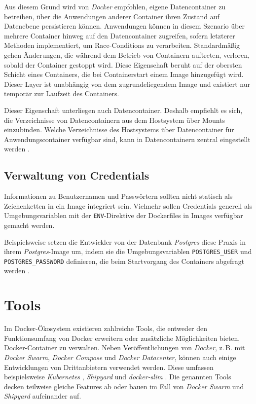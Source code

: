 \documentclass[../main.tex]{subfiles}
\begin{document}
      Aus diesem Grund wird von \emph{Docker} empfohlen, eigene Datencontainer zu betreiben, über die Anwendungen anderer Container ihren Zustand auf Datenebene persistieren können. Anwendungen können in diesem Szenario über mehrere Container hinweg auf den Datencontainer zugreifen, sofern letzterer Methoden implementiert, um Race-Conditions zu verarbeiten. Standardmäßig gehen Änderungen, die während dem Betrieb von Containern auftreten, verloren, sobald der Container gestoppt wird. Diese Eigenschaft beruht auf der obersten Schicht eines Containers, die bei Containerstart einem Image hinzugefügt wird. Dieser Layer ist unabhängig von dem zugrundeliegendem Image und existiert nur temporär zur Laufzeit des Containers.

      Dieser Eigenschaft unterliegen auch Datencontainer. Deshalb empfiehlt es sich, die Verzeichnisse von Datencontainern aus dem Hostsystem über Mounts einzubinden. Welche Verzeichnisse des Hostsystems über Datencontainer für Anwendungscontainer verfügbar sind, kann in Datencontainern zentral eingestellt werden \cite{dockerManageDataContainers}.


    \subsection{Verwaltung von Credentials}
      Informationen zu Benutzernamen und Passwörtern sollten nicht statisch als Zeichenketten in ein Image integriert sein. Vielmehr sollen Credentials generell als Umgebungsvariablen mit der \texttt{ENV}-Direktive der Dockerfiles in Images verfügbar gemacht werden.

      Beispielsweise setzen die Entwickler von der Datenbank \emph{Postgres} diese Praxis in ihrem \emph{Postgres}-Image um, indem sie die Umgebungsvariablen \texttt{POSTGRES\_USER} und \texttt{POSTGRES\_PASSWORD} definieren, die beim Startvorgang des Containers abgefragt werden \cite{dockerHubPostgres}\cite{githubPostgresCredentialCheck}.

  \section{Tools}
    Im Docker-Ökosystem existieren zahlreiche Tools, die entweder den Funktionsumfang von Docker erweitern oder zusätzliche Möglichkeiten bieten, Docker-Container zu verwalten. Neben Veröffentlichungen von \emph{Docker}, z.\,B. mit \emph{Docker Swarm}, \emph{Docker Compose} und \emph{Docker Datacenter}, können auch einige Entwicklungen von Drittanbietern verwendet werden. Diese umfassen beispielsweise \emph{Kubernetes} \cite{kubernetes}, \emph{Shipyard} \cite{shipyard} und \emph{docker-slim} \cite{githubDockerSlim}. Die genannten Tools decken teilweise gleiche Features ab oder bauen im Fall von \emph{Docker Swarm} und \emph{Shipyard} aufeinander auf.
\end{document}
